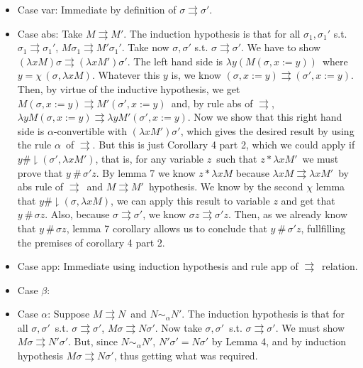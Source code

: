\documentclass{article}
\newcommand{\alp}{\ensuremath{\alpha}}
\newcommand{\alphaeqsym}{\ensuremath{\sim_\alpha}}
\newcommand{\restfresh}[3]{\ensuremath{#1 \mathbin{\#\!\!\downharpoonright} (#2,#3)}}
\newcommand{\freer}[2]{\ensuremath{#1 *#2}}
\newcommand{\freshr}[2]{\ensuremath{#1\ \#\,#2}}
\newcommand{\upd}[3]{\ensuremath{#1, #2 := #3}}
\newcommand{\choice}[1]{\ensuremath{\chi\,#1}}
\begin{document}
\begin{itemize}
\item Case var: Immediate by definition of $\sigma \rightrightarrows \sigma'$.
\item Case abs: Take $M \rightrightarrows M'$. The induction hypothesis is that for all $\sigma_1,\sigma_1'$ s.t. $\sigma_1 \rightrightarrows \sigma_1'$, $M \sigma_1 \rightrightarrows M' \sigma_1'$. Take now $\sigma,\sigma'$ s.t. $\sigma \rightrightarrows \sigma'$. We have to show $(\lambda x M) \sigma \rightrightarrows (\lambda x M') \sigma'$. The left hand side is $\lambda y (M (\upd{\sigma}{x}{y}))$\ where $y = \choice{(\sigma, \lambda x M)}$. Whatever this $y$ is, we know $(\upd{\sigma}{x}{y}) \rightrightarrows (\upd{\sigma'}{x}{y})$. Then, by virtue of the inductive hypothesis, we get $M (\upd{\sigma}{x}{y}) \rightrightarrows M' (\upd{\sigma'}{x}{y})$\ and, by rule abs of $\rightrightarrows$, $\lambda y M (\upd{\sigma}{x}{y}) \rightrightarrows \lambda y M' (\upd{\sigma'}{x}{y})$. Now we show that this right hand side is \alp-convertible with $(\lambda x M') \sigma'$, which gives the desired result by using the rule \alp\ of $\rightrightarrows$. But this is just Corollary 4 part 2, which we could apply if $\restfresh{y}{\sigma'}{\lambda x M'}$, that is, for any variable $z$\ such that $\freer{z}{\lambda x M'}$\ we must prove that $\freshr{y}{\sigma' z}$. By lemma 7 we know $\freer{z}{\lambda x M}$ because $\lambda x M \rightrightarrows \lambda x M'$\ by abs rule of $\rightrightarrows$\ and $M \rightrightarrows M'$\ hypothesis. We know by the second $\chi$ lemma that $\restfresh{y}{\sigma}{\lambda x M}$, we can apply this result to variable $z$ and get that $\freshr{y}{\sigma z}$. Also, because $\sigma \rightrightarrows \sigma'$, we know $\sigma z \rightrightarrows \sigma' z$. Then, as we already know that $\freshr{y}{\sigma z}$, lemma 7 corollary allows us to conclude that $\freshr{y}{\sigma' z}$, fullfilling the premises of corollary 4 part 2.
 \item Case app: Immediate using induction hypothesis and rule app of $\rightrightarrows$\ relation.
 \item Case $\beta$:
 \item Case $\alpha$: Suppose $M \rightrightarrows N$\ and $N \alphaeqsym N'$. The induction hypothesis is that for all $\sigma , \sigma'$\ s.t. $\sigma \rightrightarrows \sigma'$, $M \sigma \rightrightarrows N \sigma'$. Now take $\sigma,\sigma'$\ s.t.  $\sigma \rightrightarrows \sigma'$. We must show $M \sigma \rightrightarrows N' \sigma'$. But, since $N \alphaeqsym N'$, $N' \sigma' = N \sigma'$ by Lemma 4, and by induction hypothesis $M \sigma \rightrightarrows N \sigma'$, thus getting what was required.
\end{itemize}
\end{document}
